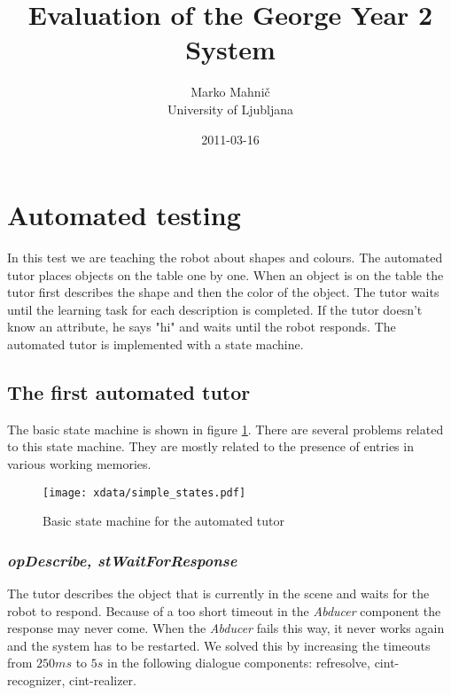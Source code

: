\documentclass{article}
\begin{document}
\title{Evaluation of the George Year 2 System}
\author{Marko Mahnič\\ University of Ljubljana}
\date{2011-03-16}

\maketitle

\section{Automated testing}

In this test we are teaching the robot about shapes and colours. The automated
tutor places objects on the table one by one. When an object is on the table
the tutor first describes the shape and then the color of the object. The tutor
waits until the learning task for each description is completed. If the tutor
doesn't know an attribute, he says "hi" and waits until the robot responds.
The automated tutor is implemented with a state machine. 

\subsection{The first automated tutor}

The basic state machine is shown in figure \ref{fig:simpleStates}. There are
several problems related to this state machine. They are mostly related to the
presence of entries in various working memories.

\begin{figure}
\texttt{[image: xdata/simple\_states.pdf]}
\label{fig:simpleStates}
\caption{Basic state machine for the automated tutor}
\end{figure}

\subsubsection*{\em opDescribe, stWaitForResponse }

The tutor describes the object that is currently in the scene and waits for the
robot to respond. Because of a too short timeout in the {\em Abducer} component
the response may never come. When the {\em Abducer} fails this way, it never
works again and the system has to be restarted. We solved this by increasing
the timeouts from $250ms$ to $5s$ in the following dialogue components:
refresolve, cint-recognizer, cint-realizer.
\end{document}
